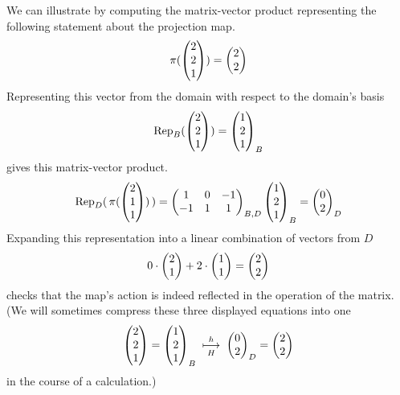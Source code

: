 \begin{example}
We can illustrate  by computing
the matrix-vector product representing the following statement 
about the projection map.
\begin{equation*}
  \pi(
     \colvec{2 \\ 2 \\ 1}
     )=\colvec{2 \\ 2}
\end{equation*}
Representing this vector from the domain
with respect to the domain's basis
\begin{equation*}
   \rep{\colvec{2 \\ 2 \\ 1}}{B}=
        \colvec{1 \\ 2 \\ 1}_B
\end{equation*}
gives this matrix-vector product.
\begin{equation*}
   \rep{ \,\pi(\colvec{2 \\ 1 \\ 1})\,}{D}=
      \begin{pmatrix}
        1  &0  &-1  \\
        -1 &1  &1
      \end{pmatrix}_{B,D}
   \colvec{1 \\ 2 \\ 1}_B
   =
   \colvec{0 \\ 2}_D
\end{equation*}
Expanding this representation into a linear combination of vectors from
\( D \) 
\begin{equation*}
   0\cdot\colvec{2 \\ 1}
   +2\cdot\colvec{1 \\ 1}
   =
   \colvec{2 \\ 2}
\end{equation*}
checks that the map's action is indeed
reflected in the operation of the matrix.
(We will sometimes compress these three displayed equations into one 
\begin{equation*}
  \colvec{2 \\ 2 \\ 1}=\colvec{1 \\ 2 \\ 1}_B
    \;\overset{h}{\underset{H}{\longmapsto}}\;
  \colvec{0 \\ 2}_D=\colvec{2 \\ 2}    
\end{equation*}
in the course of a calculation.)
\end{example}

